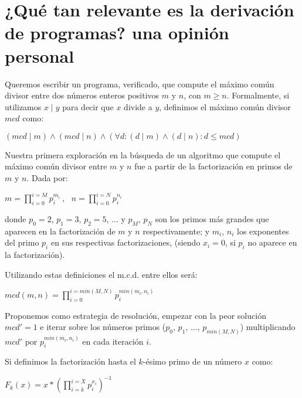 \documentclass[12pt, a4paper, openany, fleqn]{book}
\begin{document}
    \section{¿Qué tan relevante es la derivación de programas? una opinión personal}
    Queremos escribir un programa, verificado, que compute el máximo común divisor entre dos números enteros positivos $m$ y $n$, con $m \geqslant n$. Formalmente, si utilizamos $x \mid y$ para decir que $x$ divide a $y$, definimos el máximo común divisor $mcd$ como:

    \begin{center}
        \begin{math}
            (mcd \mid m) \land (mcd \mid n) \land (\forall d: (d \mid m) \land (d \mid n) : d \leq mcd)
        \end{math}
    \end{center}

    Nuestra primera exploración en la búsqueda de un algoritmo que compute el máximo común divisor entre $m$ y $n$ fue a partir de la factorización en primos de $m$ y $n$. Dada por:

    \begin{center}
        \begin{math}
            m = \prod_{i=0}^{i=M} p_{i}^{m_i}\ , \ \ \ n = \prod_{i=0}^{i=N} p_{i}^{n_i}
        \end{math}
    \end{center}

    donde $p_0=2$, $p_1= 3$, $p_2= 5$, ... y $p_{M}$, $p_{N}$ son los primos más grandes que aparecen en la factorización de $m$ y $n$ respectivamente; y $m_i$, $n_i$ los exponentes del primo $p_i$ en sus respectivas factorizaciones, (siendo $x_i=0$, si $p_i$ no aparece en la factorización).

    Utilizando estas definiciones el m.c.d. entre ellos será:

    \begin{center}
        \begin{math}
            mcd(m, n) = \prod_{i=0}^{i=min(M, N)} p_{i}^{min(m_i, n_i)}
        \end{math}
    \end{center}

    Proponemos como estrategia de resolución, empezar con la peor solución $mcd' = 1$ e iterar sobre los números primos ($p_0$, $p_1$, ..., $p_{min(M, N)}$) multiplicando $mcd'$ por $p_{i}^{min(m_{i}, n_{i})}$ en cada iteración $i$.

    Si definimos la factorización hasta el $k$-ésimo primo de un número $x$ como:
    \begin{center}
        \begin{math}
            F_k(x) = x * (\prod_{i=k}^{i=X} p_{i}^{x_i})^{-1}
        \end{math}
    \end{center}
\end{document}
